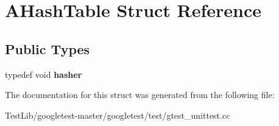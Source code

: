 \hypertarget{structAHashTable}{}\section{A\+Hash\+Table Struct Reference}
\label{structAHashTable}
\subsection*{Public Types}
\begin{DoxyCompactItemize}
\item 
\mbox{\label{structAHashTable_af0df4ce57a783be396e80cb8df6b6259}} 
typedef void {\bfseries hasher}
\end{DoxyCompactItemize}


The documentation for this struct was generated from the following file\+:\begin{DoxyCompactItemize}
\item 
Test\+Lib/googletest-\/master/googletest/test/gtest\+\_\+unittest.\+cc\end{DoxyCompactItemize}
